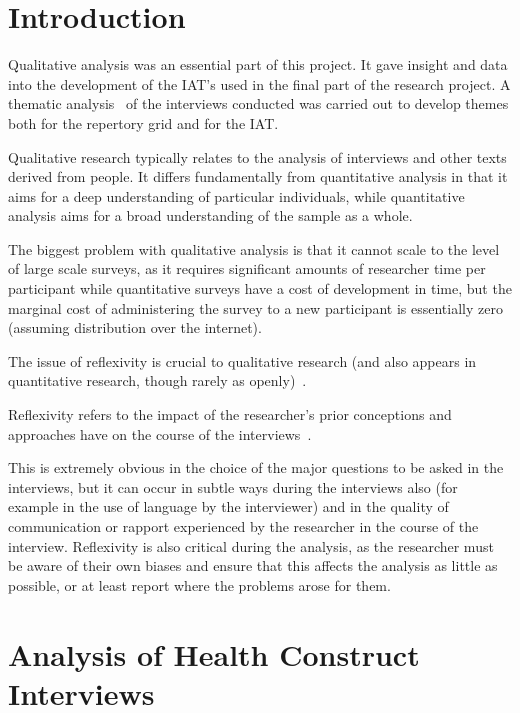 
\section{Introduction}
\label{sec:introduction}

Qualitative analysis was an essential part of this project.  
It gave insight and data into the development of the IAT's used in the final part of the research project.
A thematic analysis~\cite{braun2006using} of the interviews conducted was carried out to develop themes both for the repertory grid and for the IAT.

Qualitative research typically relates to the analysis of interviews and other texts derived from people. It differs fundamentally from quantitative analysis in that it aims for a deep understanding of particular individuals, while quantitative analysis aims for a broad understanding of the sample as a whole. 

The biggest problem with qualitative analysis is that it cannot scale to the level of large scale surveys, as it requires significant amounts of researcher time per participant while quantitative surveys have a cost of development in time, but the marginal cost of administering the survey to a new participant is essentially zero (assuming distribution over the internet).

The issue of reflexivity is crucial to qualitative research (and also appears in quantitative research, though rarely as openly)~\cite{rosenthal1967covert, rosenthal1969interpersonal}.

Reflexivity refers to the impact of the researcher's prior conceptions and approaches have on the course of the interviews~\cite{finlay2002outing}.

This is extremely obvious in the choice of the major questions to be asked in the interviews, but it can occur in subtle ways during the interviews also (for example in the use of language by the interviewer) and in the quality of communication or rapport experienced by the researcher in the course of the interview. Reflexivity is also critical during the analysis, as the researcher must be aware of their own biases and ensure that this affects the analysis as little as possible, or at least report where the problems arose for them.


\section{Analysis of Health Construct Interviews}



